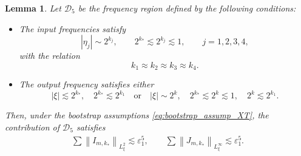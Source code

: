 \documentclass[reqno,english,11pt]{amsart}
\newcommand{\eps}{\varepsilon}
\newcommand{\snorm}[1]{\left\|#1\right\|}
\newtheorem{lemma}[theorem]{Lemma}
\theoremstyle{definition}
\numberwithin{equation}{section}
\begin{document}
\begin{lemma}\label{prop:deg_case_5}
Let $\mathcal{D}_5$ be the frequency region defined by the following conditions:
\begin{itemize}
    \item The input frequencies satisfy
    $$ |\eta_j| \sim 2^{k_j}, \qquad 2^{k_*} \lesssim 2^{k_j} \lesssim 1, \qquad j=1,2,3,4,$$
    with the relation
    $$  k_1 \approx k_2 \approx k_3 \approx k_4.$$
    \item The output frequency satisfies either
    $$  |\xi| \lesssim 2^{k_*},\quad 2^{k_*}\lesssim 2^{k_1}  \quad \text{or} \quad |\xi| \sim 2^{k}, \quad 2^{k_*} \lesssim 2^{k} \lesssim 1, \quad 2^{k}\lesssim 2^{k_1}.$$
\end{itemize}
Then, under the bootstrap assumptions \eqref{eq:bootstrap_assump_XT}, the contribution of $\mathcal{D}_5$ satisfies
    \begin{align*}
        \sum\snorm{I_{m,k_*}}_{L^2_\xi}\lesssim \eps_1^5,\qquad
        \sum\snorm{J_{m,k_*}}_{L^\infty_\xi}\lesssim \eps_1^5.
    \end{align*}
\end{lemma}
\end{document}
